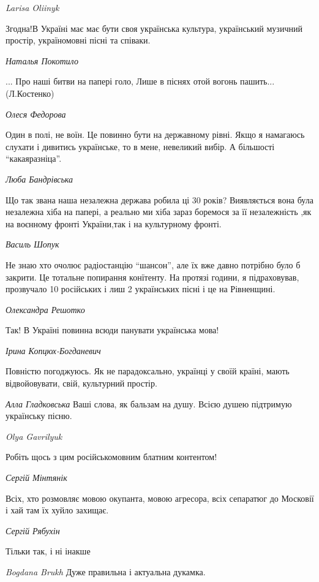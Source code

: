 \emph{Larisa Oliinyk}

Згодна!В Україні має має бути своя українська культура, український музичний простір, україномовні пісні та співаки.

\emph{Наталья Покотило}

... Про наші битви на папері голо,
Лише в піснях отой вогонь пашить...
(Л.Костенко)

\emph{Олеся Федорова}

Один в полі, не воїн. Це повинно бути на державному рівні. Якщо я намагаюсь
слухати і дивитись українське, то в мене, невеликий вибір. А більшості
\enquote{какаяразніца}.

\emph{Люба Бандрівська}

Що так звана наша незалежна держава робила ці 30 років? Виявляється вона була
незалежна хіба на папері, а реально ми хіба зараз боремося за її незалежність
,як на воєнному фронті України,так і на культурному фронті.

\emph{Василь Шопук}

Не знаю хто очолює радіостанцію \enquote{шансон}, але їх вже давно потрібно було б
закрити. Це тотальне попирання конїтенту. На протязі години, я підраховував,
прозвучало 10 російських і лиш 2 українських пісні і це на Рівненщині.

\emph{Олександра Решотко}

Так! В Україні повинна всюди панувати українська мова!

\emph{Ірина Копцюх-Богданевич}

Повністю погоджуюсь. Як не парадоксально, українці у своїй країні, мають відвойовувати, свій, культурний простір.

\emph{Алла Гладковська}
Ваші слова, як бальзам на душу. Всією душею підтримую українську пісню.

\emph{Olya Gavrilyuk}

Робіть щось з цим російськомовним блатним контентом!

\emph{Сергій Мінтянік}

Всіх, хто розмовляє мовою окупанта, мовою агресора, всіх сепаратюг до Московії і хай там їх хуйло захищає.

\emph{Сергій Рябухін}

Тільки так, і ні інакше

\emph{Bogdana Brukh}
Дуже правильна і актуальна дукамка.
